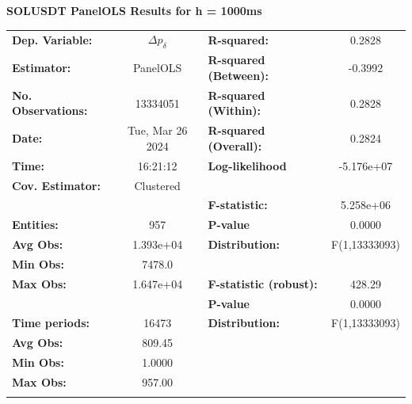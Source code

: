 \documentclass[a4paper, oneside, notitlepage]{book}
\begin{document}
\begin{table}
\textbf{SOLUSDT PanelOLS Results for h = 1000ms}
\begin{center}
\begin{tabular}{lclc}
\hline
\textbf{Dep. Variable:}    &         $\Delta p_{\delta}$         & \textbf{  R-squared:         }   &      0.2828      \\
\textbf{Estimator:}        &      PanelOLS      & \textbf{  R-squared (Between):}  &     -0.3992      \\
\textbf{No. Observations:} &      13334051      & \textbf{  R-squared (Within):}   &      0.2828      \\
\textbf{Date:}             &  Tue, Mar 26 2024  & \textbf{  R-squared (Overall):}  &      0.2824      \\
\textbf{Time:}             &      16:21:12      & \textbf{  Log-likelihood     }   &    -5.176e+07    \\
\textbf{Cov. Estimator:}   &     Clustered      & \textbf{                     }   &                  \\
\textbf{}                  &                    & \textbf{  F-statistic:       }   &    5.258e+06     \\
\textbf{Entities:}         &        957         & \textbf{  P-value            }   &      0.0000      \\
\textbf{Avg Obs:}          &     1.393e+04      & \textbf{  Distribution:      }   &  F(1,13333093)   \\
\textbf{Min Obs:}          &       7478.0       & \textbf{                     }   &                  \\
\textbf{Max Obs:}          &     1.647e+04      & \textbf{  F-statistic (robust):} &      428.29      \\
\textbf{}                  &                    & \textbf{  P-value            }   &      0.0000      \\
\textbf{Time periods:}     &       16473        & \textbf{  Distribution:      }   &  F(1,13333093)   \\
\textbf{Avg Obs:}          &       809.45       & \textbf{                     }   &                  \\
\textbf{Min Obs:}          &       1.0000       & \textbf{                     }   &                  \\
\textbf{Max Obs:}          &       957.00       & \textbf{                     }   &                  \\
\textbf{}                  &                    & \textbf{                     }   &                  \\

\end{tabular}
\end{center}
\end{table}
\end{document}
